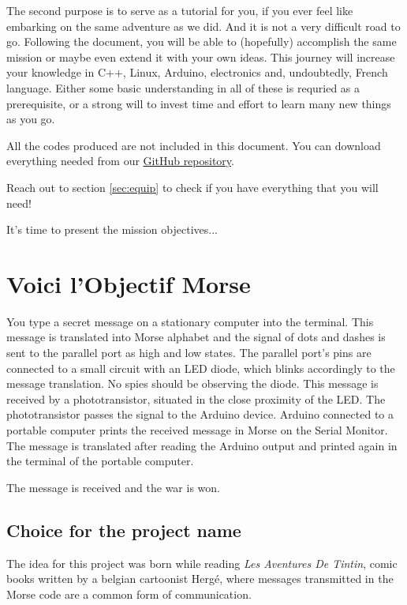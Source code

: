 \documentclass[12pt]{report}
\begin{document}
The second purpose is to serve as a tutorial for you, if you ever feel like embarking on the same adventure as we did. And it is not a very difficult road to go. Following the document, you will be able to (hopefully) accomplish the same mission or maybe even extend it with your own ideas. This journey will increase your knowledge in C++, Linux, Arduino, electronics and, undoubtedly, French language. Either some basic understanding in all of these is requried as a prerequisite, or a strong will to invest time and effort to learn many new things as you go.

All the codes produced are not included in this document. You can download everything needed from our \href{https://github.com/camillejr/objectif_morse}{GitHub repository}.

Reach out to section \ref{sec:equip} to check if you have everything that you will need!

It's time to present the mission objectives...

\section{Voici l'Objectif Morse}

You type a secret message on a stationary computer into the terminal. This message is translated into Morse alphabet and the signal of dots and dashes is sent to the parallel port as high and low states. The parallel port's pins are connected to a small circuit with an LED diode, which blinks accordingly to the message translation. No spies should be observing the diode. This message is received by a phototransistor, situated in the close proximity of the LED. The phototransistor passes the signal to the Arduino device. Arduino connected to a portable computer prints the received message in Morse on the Serial Monitor. The message is translated after reading the Arduino output and printed again in the terminal of the portable computer. 

The message is received and the war is won.

\subsection{Choice for the project name}

The idea for this project was born while reading \textit{Les Aventures De Tintin}, comic books written by a belgian cartoonist Hergé, where messages transmitted in the Morse code are a common form of communication. 
\end{document}
